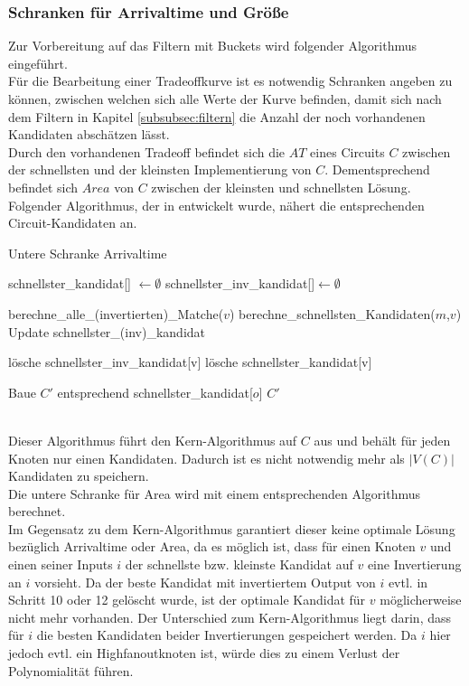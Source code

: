 \documentclass[11pt, a4paper, german]{article}
\begin{document}
\subsubsection{Schranken für Arrivaltime und Größe}
\label{subsubsec:schrankenalgo}
Zur Vorbereitung auf das Filtern mit Buckets wird folgender Algorithmus eingeführt.\\
Für die Bearbeitung einer Tradeoffkurve ist es notwendig Schranken angeben zu können, zwischen welchen sich alle Werte der Kurve befinden, damit sich nach dem Filtern in Kapitel \ref{subsubsec:filtern} die Anzahl der noch vorhandenen Kandidaten abschätzen lässt. \\
Durch den vorhandenen Tradeoff befindet sich die $AT$ eines Circuits $C$ zwischen der schnellsten und der kleinsten Implementierung von $C$. Dementsprechend befindet sich $Area$ von $C$ zwischen der kleinsten und schnellsten Lösung. Folgender Algorithmus, der in \cite{Elbert} entwickelt wurde, nähert die entsprechenden Circuit-Kandidaten an.\\

\begin{algorithm}[H]
 \LinesNumbered
 \DontPrintSemicolon
 \caption{Untere Schranke Arrivaltime}

 schnellster\_kandidat[] $\gets \emptyset$\;
 schnellster\_inv\_kandidat[]$ \gets \emptyset$\;
 {
   berechne\_alle\_(invertierten)\_Matche($v$)\;
   {
      berechne\_schnellsten\_Kandidaten($m$,$v$)\;
      Update schnellster\_(inv)\_kandidat\;
   }
   {
      
      {
	l\"osche schnellster\_inv\_kandidat[v]\;
      }
      \Else
      {
	l\"osche schnellster\_kandidat[v]\;
      }
   }
 }
 Baue $C'$ entsprechend schnellster\_kandidat[$o$]\;
 \Return $C'$\;
\end{algorithm}\ \\

Dieser Algorithmus führt den Kern-Algorithmus  auf $C$ aus und behält für jeden Knoten nur einen Kandidaten. Dadurch ist es nicht notwendig mehr als $|V(C)|$ Kandidaten zu speichern. \\
 Die untere Schranke für Area wird mit einem entsprechenden Algorithmus berechnet. \\
Im Gegensatz zu dem Kern-Algorithmus garantiert dieser keine optimale Lösung bezüglich Arrivaltime oder Area, da es möglich ist, dass für einen Knoten $v$ und einen seiner Inputs $i$ der schnellste bzw. kleinste Kandidat auf $v$ eine Invertierung an $i$ vorsieht. Da der beste Kandidat mit invertiertem Output von $i$ evtl. in Schritt 10  oder 12 gelöscht wurde, ist der optimale Kandidat für $v$ möglicherweise nicht mehr vorhanden. Der Unterschied zum Kern-Algorithmus liegt darin, dass für $i$ die besten Kandidaten beider Invertierungen gespeichert werden. Da $i$ hier jedoch evtl. ein Highfanoutknoten ist, würde dies zu einem Verlust der Polynomialität führen.\\
\end{document}

